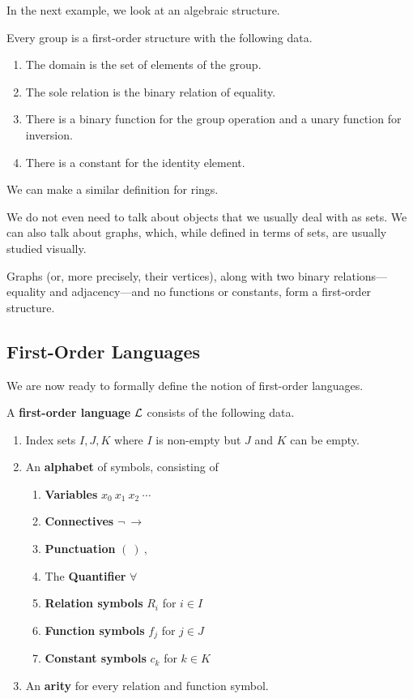In the next example, we look at an algebraic structure.
\begin{boxexample}[Groups]
    Every group is a first-order structure with the following data.
    \begin{enumerate}
        \item The domain is the set of elements of the group.
        \item The sole relation is the binary relation of equality.
        \item There is a binary function for the group operation and a unary function for inversion.
        \item There is a constant for the identity element.
    \end{enumerate}
\end{boxexample}
We can make a similar definition for rings.

We do not even need to talk about objects that we usually deal with as sets. We can also talk about graphs, which, while defined in terms of sets, are usually studied visually.
\begin{boxexample}[Graphs]
    Graphs (or, more precisely, their vertices), along with two binary relations---equality and adjacency---and no functions or constants, form a first-order structure.
\end{boxexample}

\subsection{First-Order Languages}

We are now ready to formally define the notion of first-order languages.

\begin{boxdefinition}\label{Ch2:Def:First-Order_Language}
    A \textbf{first-order language} $\mathcal{L}$ consists of the following data.
    \begin{enumerate}
        \item Index sets $I, J, K$ where $I$ is non-empty but $J$ and $K$ can be empty.
        \item An \textbf{alphabet} of symbols, consisting of
        \begin{enumerate}[noitemsep]
            \item \textbf{Variables} $x_0 \ x_1 \ x_2 \ \cdots$
            \item \textbf{Connectives} $\neg \ \to$
            \item \textbf{Punctuation} $( \ ) \ ,$
            \item The \textbf{Quantifier} $\forall$
            \item \textbf{Relation symbols} $R_i$ for $i \in I$
            \item \textbf{Function symbols} $f_j$ for $j \in J$
            \item \textbf{Constant symbols} $c_k$ for $k \in K$
        \end{enumerate}
        \item An \textbf{arity} for every relation and function symbol.
    \end{enumerate}
\end{boxdefinition}

